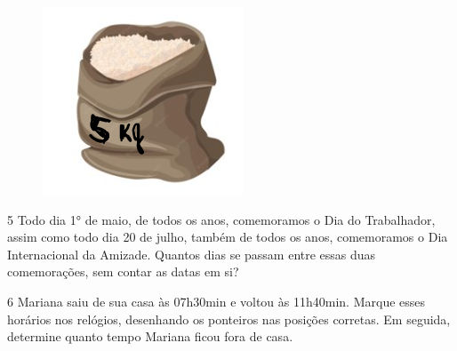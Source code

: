 \begin{figure}[htpb!]
\includegraphics[width=\textwidth]{./media/image53.png}
\end{figure}

\num{5} Todo dia 1° de maio, de todos os anos, comemoramos o Dia do Trabalhador,
assim como todo dia 20 de julho, também de todos os anos, comemoramos o
Dia Internacional da Amizade. Quantos dias se passam entre essas duas
comemorações, sem contar as datas em si?


\num{6} Mariana saiu de sua casa às 07h30min e voltou às 11h40min. Marque esses
horários nos relógios, desenhando os ponteiros nas posições
corretas. Em seguida, determine quanto tempo Mariana ficou fora de casa.


